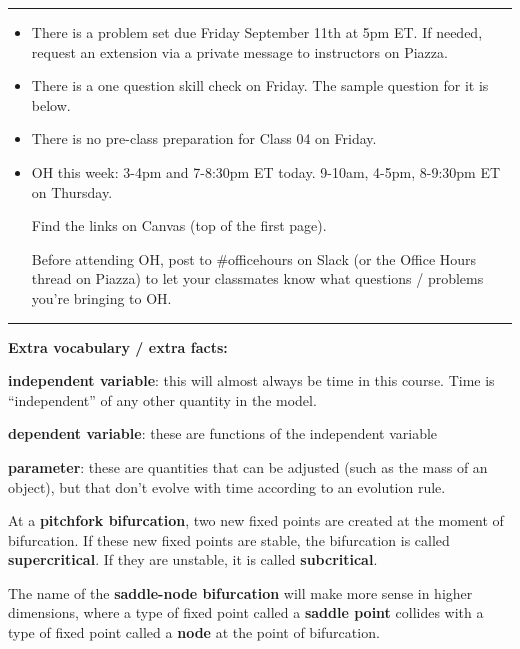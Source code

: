 \documentclass[12pt,letterpaper,noanswers]{exam}
\begin{document}
 \pdfpageheight 11in 
  \pdfpagewidth 8.5in

\vspace{0.2cm}

\hrule
\vspace{0.2cm}

\begin{itemize}
    \item There is a problem set due Friday September 11th at 5pm ET.  If needed, request an extension via a private message to instructors on Piazza.
    \item There is a one question skill check on Friday.  The sample question for it is below.
    \item There is no pre-class preparation for Class 04 on Friday.
    \item OH this week: 3-4pm and 7-8:30pm ET today.  9-10am, 4-5pm, 8-9:30pm ET on Thursday. 
    
    Find the links on Canvas (top of the first page).  
    
    Before attending OH, post to \#officehours on Slack (or the Office Hours thread on Piazza) to let your classmates know what questions / problems you're bringing to OH.
\end{itemize}

\hrule
\vspace{0.2cm}

\noindent \textbf{Extra vocabulary / extra facts:}
\begin{tcolorbox}

\textbf{independent variable}: this will almost always be time in this course.  Time is ``independent'' of any other quantity in the model.

\textbf{dependent variable}: these are functions of the independent variable

\textbf{parameter}: these are quantities that can be adjusted (such as the mass of an object), but that don't evolve with time according to an evolution rule.  

At a \textbf{pitchfork bifurcation}, two new fixed points are created at the moment of bifurcation.  If these new fixed points are stable, the bifurcation is called \textbf{supercritical}.  If they are unstable, it is called \textbf{subcritical}.

The name of the \textbf{saddle-node bifurcation} will make more sense in higher dimensions, where a type of fixed point called a \textbf{saddle point} collides with a type of fixed point called a \textbf{node} at the point of bifurcation.

\end{tcolorbox}
\end{document}
